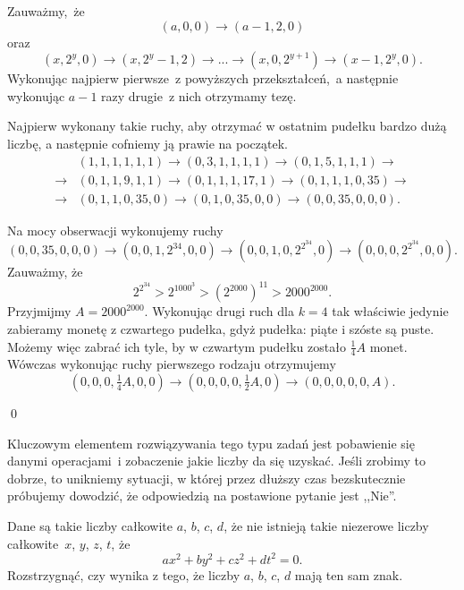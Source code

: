 \vspace{5px}
\noindent
Zauważmy,~że
\[
	(a, 0, 0) \rightarrow (a - 1, 2, 0)
\]
oraz
\[
	(x, 2^y, 0) \rightarrow (x, 2^y - 1, 2) \rightarrow ... \rightarrow (x, 0, 2^{y + 1}) \rightarrow (x - 1, 2^{y}, 0).
\]
Wykonując najpierw pierwsze~z powyższych przekształceń,~a następnie wykonując ${a - 1}$ razy drugie~z nich otrzymamy tezę.

\vspace{10px}
\noindent
Najpierw wykonany takie ruchy, aby otrzymać w ostatnim pudełku bardzo dużą liczbę, a następnie cofniemy ją prawie na początek.
\begin{align*}
	&(1, 1, 1, 1, 1, 1) \rightarrow (0, 3, 1, 1, 1, 1) \rightarrow (0, 1, 5, 1, 1, 1)  \rightarrow \\
	\rightarrow &(0, 1, 1, 9, 1, 1)  \rightarrow (0, 1, 1, 1, 17, 1)  \rightarrow (0, 1, 1, 1, 0, 35) \rightarrow \\
	\rightarrow  &(0, 1, 1, 0, 35, 0)  \rightarrow (0, 1, 0, 35, 0, 0)  \rightarrow (0, 0, 35, 0, 0, 0).
\end{align*}

\noindent
Na mocy obserwacji wykonujemy ruchy
\[
	 (0, 0, 35, 0, 0, 0) \rightarrow  (0, 0, 1, 2^{34}, 0, 0) \rightarrow  (0, 0, 1, 0, 2^{2^{34}}, 0) \rightarrow  (0, 0, 0, 2^{2^{34}}, 0 , 0).
\]
Zauważmy, że 
\[
	2^{2^{34}} > 2^{1000^3} > \left(2^{2000}\right)^{11} > 2000^{2000}.
\] 
Przyjmijmy $A = 2000^{2000}$. Wykonując drugi ruch dla $k = 4$ tak właściwie jedynie zabieramy monetę z czwartego pudełka, gdyż pudełka: piąte i szóste są puste. Możemy więc zabrać ich tyle, by w czwartym pudełku zostało $\frac{1}{4}A$ monet. Wówczas wykonując ruchy pierwszego rodzaju otrzymujemy
\[
	(0, 0, 0, \tfrac{1}{4}A, 0, 0) \rightarrow (0, 0, 0, 0, \tfrac{1}{2}A, 0) \rightarrow (0, 0, 0, 0, 0, A).
\]

\qed

\noindent
Kluczowym elementem rozwiązywania tego typu zadań jest pobawienie się danymi operacjami~i zobaczenie jakie liczby da się uzyskać. Jeśli zrobimy to dobrze, to unikniemy sytuacji, w której przez dłuższy czas bezskutecznie próbujemy dowodzić, że odpowiedzią na postawione pytanie jest ,,Nie''.

\vspace{5px}



\noindent
Dane są takie liczby całkowite $a$, $b$, $c$, $d$, że nie istnieją takie niezerowe liczby całkowite~$x$, $y$, $z$, $t$, że
\[
	ax^2 + by^2 + cz^2 + dt^2 = 0.
\]
Rozstrzygnąć, czy wynika z tego, że liczby $a$, $b$, $c$, $d$ mają ten sam znak.

